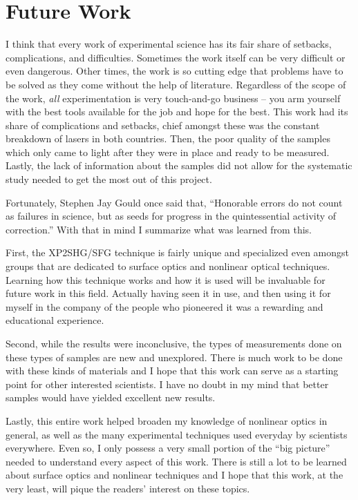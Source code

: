 \section{Future Work}
I think that every work of experimental science has its fair share of setbacks,
complications, and difficulties. Sometimes the work itself can be very difficult
or even dangerous. Other times, the work is so cutting edge that problems have
to be solved as they come without the help of literature. Regardless of the
scope of the work, \emph{all} experimentation is very touch-and-go business --
you arm yourself with the best tools available for the job and hope for the
best. This work had its share of complications and setbacks, chief amongst these
was the constant breakdown of lasers in both countries. Then, the poor quality
of the samples which only came to light after they were in place and ready to be
measured. Lastly, the lack of information about the samples did not allow for
the systematic study needed to get the most out of this project.

Fortunately, Stephen Jay Gould once said that, ``Honorable errors do not count
as failures in science, but as seeds for progress in the quintessential activity
of correction.'' With that in mind I summarize what was learned from this.

First, the XP2SHG/SFG technique is fairly unique and specialized even amongst
groups that are dedicated to surface optics and nonlinear optical techniques.
Learning how this technique works and how it is used will be invaluable for
future work in this field. Actually having seen it in use, and then using it for
myself in the company of the people who pioneered it was a rewarding and
educational experience.

Second, while the results were inconclusive, the types of measurements done on
these types of samples are new and unexplored. There is much work to be done
with these kinds of materials and I hope that this work can serve as a starting
point for other interested scientists. I have no doubt in my mind that better
samples would have yielded excellent new results.

Lastly, this entire work helped broaden my knowledge of nonlinear optics in
general, as well as the many experimental techniques used everyday by scientists
everywhere. Even so, I only possess a very small portion of the ``big picture''
needed to understand every aspect of this work. There is still a lot to be
learned about surface optics and nonlinear techniques and I hope that this work,
at the very least, will pique the readers' interest on these topics.

\stopcontents[chapters]
